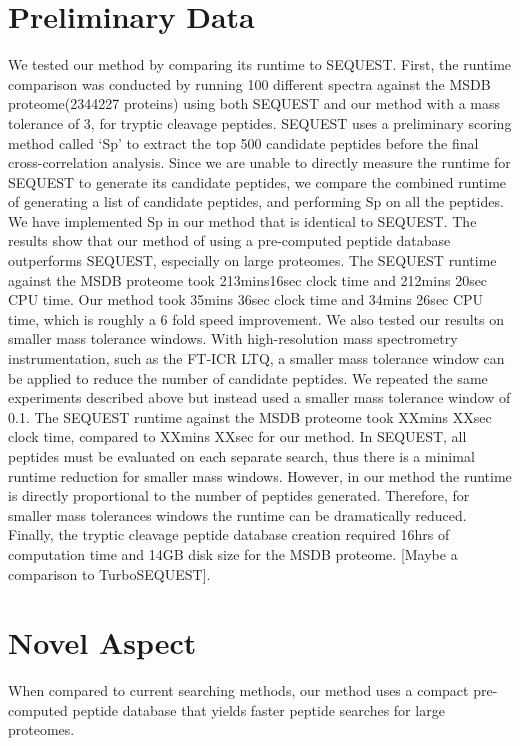 \documentclass[12pt]{article}
\begin{document}
\section{Preliminary Data}
We tested our method by comparing
its runtime to SEQUEST. First, the runtime comparison was conducted by
running 100 different spectra against the MSDB proteome(2344227 proteins) using both
SEQUEST and our method with a mass tolerance of 3, for tryptic cleavage
peptides. SEQUEST uses a preliminary scoring method called `Sp' to
extract the top 500 candidate peptides before the final cross-correlation
analysis. Since we are unable to directly measure the runtime for SEQUEST
to generate its candidate peptides, we compare the combined runtime
of generating a list of candidate peptides, and performing Sp on all
the peptides. We have implemented Sp in our method that is identical
to SEQUEST. The results show that our method of using a pre-computed
peptide database outperforms SEQUEST, especially on large proteomes. The
SEQUEST runtime against the MSDB proteome took 213mins16sec clock time
and 212mins 20sec CPU time. Our method took 35mins 36sec clock time and
34mins 26sec CPU time, which is roughly a 6 fold speed improvement.
We also tested our results on smaller mass tolerance windows. With
high-resolution mass spectrometry instrumentation, such as the FT-ICR
LTQ, a smaller mass tolerance window can be applied to reduce the number
of candidate peptides. We repeated the same experiments described
above but instead used a smaller mass tolerance window of 0.1. The
SEQUEST runtime against the MSDB proteome took XXmins XXsec clock time,
compared to XXmins XXsec for our method. In SEQUEST, all peptides must
be evaluated on each separate search, thus there is a minimal runtime
reduction for smaller mass windows. However, in our method the runtime is
directly proportional to the number of peptides generated. Therefore, for
smaller mass tolerances windows the runtime can be dramatically reduced.
Finally, the tryptic cleavage peptide database creation required 16hrs
of computation time and 14GB disk size for the MSDB proteome. [Maybe a
comparison to TurboSEQUEST].

\section{Novel Aspect}
When compared to current searching methods,
our method uses a compact pre-computed peptide database that yields
faster peptide searches for large proteomes.
\end{document}

